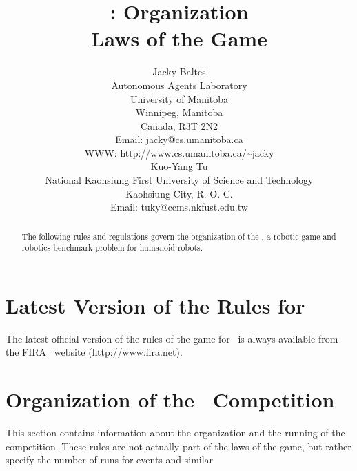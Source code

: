 \documentclass[12pt]{hurocup}
\begin{document}
\title{\HuroCup: Organization\\
  Laws of the Game \thisyear}

\author{Jacky Baltes\\
Autonomous Agents Laboratory\\
University of Manitoba\\
Winnipeg, Manitoba\\
Canada, R3T 2N2\\
Email: jacky@cs.umanitoba.ca\\
WWW: http://www.cs.umanitoba.ca/\~{ }jacky\\[5mm]
Kuo-Yang Tu\\
National Kaohsiung First University of Science and Technology\\
Kaohsiung City, R. O. C.\\
Email: tuky@ccms.nkfust.edu.tw\\
}

\maketitle
\begin{abstract}
The following rules and regulations govern the organization of the
\HuroCup, a robotic game and robotics benchmark problem for humanoid
robots.
%
\end{abstract}

\section*{Latest Version of the Rules for \HuroCup}
\label{sec:updates}

The latest official version of the rules of the game for \HuroCup\ is
always available from the FIRA \HuroCup\ website (http://www.fira.net).

\newpage

\section{Organization of the \HuroCup\ Competition}
\label{sec:organization} 

This section contains information about the organization and the
running of the competition. These rules are not actually part of the
laws of the game, but rather specify the number of runs for events and
similar 

\label{law:number-of-events}
\end{document}
